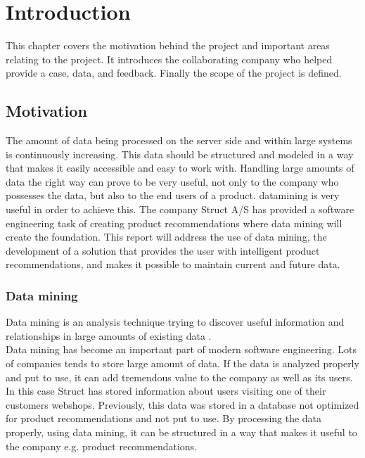 
\chapter{Introduction} %

\label{ChapterX} %


This chapter covers the motivation behind the project and important areas relating to the project. It introduces the collaborating company who helped provide a case, data, and feedback. Finally the scope of the project is defined.

\section{Motivation}
The amount of data being processed on the server side and within large systems is continuously increasing. This data should be structured and modeled in a way that makes it easily accessible and easy to work with. Handling large amounts of data the right way can prove to be very useful, not only to the company who possesses the data, but also to the end users of a product. \Gls{datamining} is very useful in order to achieve this.
The company Struct A/S has provided a software engineering task of creating product recommendations where data mining will create the foundation. This report will address the use of data mining, the development of a solution that provides the user with intelligent product recommendations, and makes it possible to maintain current and future data.

\subsection{Data mining}
Data mining is an analysis technique trying to discover useful information and relationships in large amounts of existing data \cite{dataminingSource}. \\  
Data mining has become an important part of modern software engineering. Lots of companies tends to store large amount of data. If the data is analyzed properly and put to use, it can add tremendous value to the company as well as its users. In this case \gls{Struct} has stored information about users visiting one of their customers webshops. Previously, this data was stored in a database not optimized for product recommendations and not put to use. By processing the data properly, using data mining, it can be structured in a way that makes it useful to the company e.g. product recommendations.

